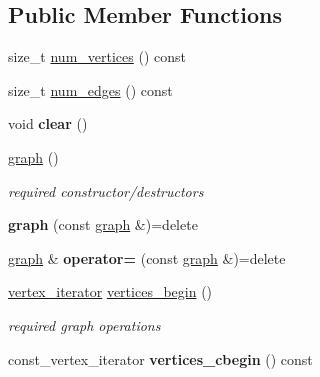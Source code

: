 \subsection*{Public Member Functions}
\begin{DoxyCompactItemize}
\item 
size\+\_\+t \hyperlink{classmystl_1_1graph_aa6fd8efc0911be8bd65f659d4d717bc9}{num\+\_\+vertices} () const 
\item 
size\+\_\+t \hyperlink{classmystl_1_1graph_a659585bd8325746aa743b5103753405b}{num\+\_\+edges} () const 
\item 
\hypertarget{classmystl_1_1graph_ab7e28ce8dedb8b396c8912b6aacf263d}{void {\bfseries clear} ()}\label{classmystl_1_1graph_ab7e28ce8dedb8b396c8912b6aacf263d}

\item 
\hypertarget{classmystl_1_1graph_a3bd4b577259268bb5ddc09953d5bbdd4}{\hyperlink{classmystl_1_1graph_a3bd4b577259268bb5ddc09953d5bbdd4}{graph} ()}\label{classmystl_1_1graph_a3bd4b577259268bb5ddc09953d5bbdd4}

\begin{DoxyCompactList}\small\item\em required constructor/destructors \end{DoxyCompactList}\item 
\hypertarget{classmystl_1_1graph_aaaec7844368eb2450398bd41c313a464}{{\bfseries graph} (const \hyperlink{classmystl_1_1graph}{graph} \&)=delete}\label{classmystl_1_1graph_aaaec7844368eb2450398bd41c313a464}

\item 
\hypertarget{classmystl_1_1graph_a331b19cbe43fab284d3329962dc2d15b}{\hyperlink{classmystl_1_1graph}{graph} \& {\bfseries operator=} (const \hyperlink{classmystl_1_1graph}{graph} \&)=delete}\label{classmystl_1_1graph_a331b19cbe43fab284d3329962dc2d15b}

\item 
\hypertarget{classmystl_1_1graph_af345ac781b3c5f8c5507b26750e80db5}{\hyperlink{classmystl_1_1graph_a173b6e21e17fd9bafdd7594b2ba3ef0a}{vertex\+\_\+iterator} \hyperlink{classmystl_1_1graph_af345ac781b3c5f8c5507b26750e80db5}{vertices\+\_\+begin} ()}\label{classmystl_1_1graph_af345ac781b3c5f8c5507b26750e80db5}

\begin{DoxyCompactList}\small\item\em required graph operations \end{DoxyCompactList}\item 
\hypertarget{classmystl_1_1graph_a7132eb9c3130efa49e521ff5d64de659}{const\+\_\+vertex\+\_\+iterator {\bfseries vertices\+\_\+cbegin} () const }\label{classmystl_1_1graph_a7132eb9c3130efa49e521ff5d64de659}


\end{DoxyCompactItemize}
